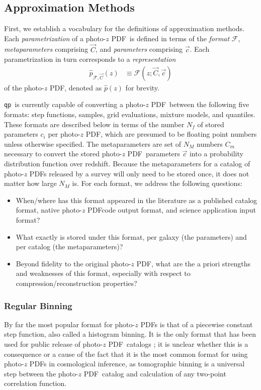 \documentclass[\docopts]{\docclass}
\newcommand{\qp}{\texttt{qp}}
\newcommand{\pz}{photo-$z$ PDF}
\begin{document}
\subsection{Approximation Methods}
\label{sec:approx}


First, we establish a vocabulary for the definitions of approximation methods.  
Each \textit{parametrization} of a \pz\ is defined in terms of the 
\textit{format} $\mathcal{F}$, \textit{metaparameters} comprising $\vec{C}$, 
and \textit{parameters} comprising $\vec{c}$.  Each parametrization in turn 
corresponds to a \textit{representation}
\begin{align}
  \hat{p}_{\mathcal{F}, \vec{C}}(z) &\equiv \mathcal{F}(z;\vec{C}, \vec{c})
\end{align}
of the \pz, denoted as $\hat{p}(z)$ for brevity.

\qp\ is currently capable of converting a \pz\ between the following five 
formats: step functions, samples, grid evaluations, mixture models, and 
quantiles.  These formats are described below in terms of the number $N_{f}$ of 
stored parameters $c_{i}$ per \pz, which are presumed to be floating point 
numbers unless otherwise specified.  The metaparameters are set of $N_{M}$ 
numbers $C_{m}$ necessary to convert the stored \pz\ parameters $\vec{c}$ into 
a probability distribution function over redshift.  Because the metaparameters 
for a catalog of \pz s released by a survey will only need to be stored once, 
it does not matter how large $N_{M}$ is.  For each format, we address the 
following questions:
\begin{itemize}
  \item When/where has this format appeared in the literature as a published 
catalog format, native \pz code output format, and science application input 
format?
  \item What exactly is stored under this format, per galaxy (the parameters) 
and per catalog (the metaparameters)?
  \item Beyond fidelity to the original \pz, what are the a priori strengths 
and weaknesses of this format, especially with respect to 
compression/reconstruction properties?
\end{itemize}

\subsubsection{Regular Binning}
\label{sec:bins}

By far the most popular format for \pz s is that of a piecewise constant step 
function, also called a histogram binning.  It is the only format that has been 
used for public release of \pz\ catalogs \citep{tanaka_photometric_2017, 
sheldon_photometric_2012}; it is unclear whether this is a consequence or a 
cause of the fact that it is the most common format for using \pz s in 
cosmological inference, as tomographic binning is a universal step between the 
\pz\ catalog and calculation of any two-point correlation function.
\end{document}
